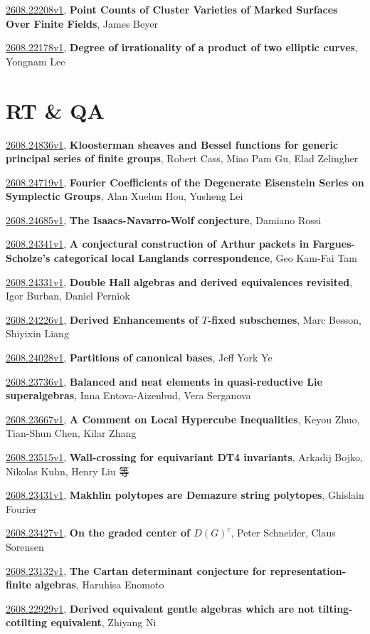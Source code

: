 \documentclass[9pt, a4paper]{article}
\theoremstyle{plain}
\theoremstyle{definition}
\theoremstyle{remark}
\newcommand{\arxiv}[3]{\href{https://arxiv.org/abs/#1}{#1}, \textbf{\textcolor{arxivblue}{#2}}, #3}
\begin{document}
\arxiv{2608.22208v1}{Point Counts of Cluster Varieties of Marked Surfaces Over Finite Fields}{James Beyer}

\arxiv{2608.22178v1}{Degree of irrationality of a product of two elliptic curves}{Yongnam Lee}


\section{RT \& QA}
\arxiv{2608.24836v1}{Kloosterman sheaves and Bessel functions for generic principal series of finite groups}{Robert Cass, Miao Pam Gu, Elad Zelingher}

\arxiv{2608.24719v1}{Fourier Coefficients of the Degenerate Eisenstein Series on Symplectic Groups}{Alan Xuelun Hou, Yusheng Lei}

\arxiv{2608.24685v1}{The Isaacs-Navarro-Wolf conjecture}{Damiano Rossi}

\arxiv{2608.24341v1}{A conjectural construction of Arthur packets in Fargues-Scholze's categorical local Langlands correspondence}{Geo Kam-Fai Tam}

\arxiv{2608.24331v1}{Double Hall algebras and derived equivalences revisited}{Igor Burban, Daniel Perniok}

\arxiv{2608.24226v1}{Derived Enhancements of $T$-fixed subschemes}{Marc Besson, Shiyixin Liang}

\arxiv{2608.24028v1}{Partitions of canonical bases}{Jeff York Ye}

\arxiv{2608.23736v1}{Balanced and neat elements in quasi-reductive Lie superalgebras}{Inna Entova-Aizenbud, Vera Serganova}

\arxiv{2608.23667v1}{A Comment on Local Hypercube Inequalities}{Keyou Zhuo, Tian-Shun Chen, Kilar Zhang}

\arxiv{2608.23515v1}{Wall-crossing for equivariant DT4 invariants}{Arkadij Bojko, Nikolas Kuhn, Henry Liu 等}

\arxiv{2608.23431v1}{Makhlin polytopes are Demazure string polytopes}{Ghislain Fourier}

\arxiv{2608.23427v1}{On the graded center of $D(G)^c$}{Peter Schneider, Claus Sorensen}

\arxiv{2608.23132v1}{The Cartan determinant conjecture for representation-finite algebras}{Haruhisa Enomoto}

\arxiv{2608.22929v1}{Derived equivalent gentle algebras which are not tilting-cotilting equivalent}{Zhiyang Ni}
\end{document}
